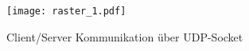 \begin{figure}[H]
\centering
\texttt{[image: raster\_1.pdf]}
\caption{Client/Server Kommunikation {\"u}ber UDP-Socket}
\label{fig:Socket-Kommunikation}
\end{figure}